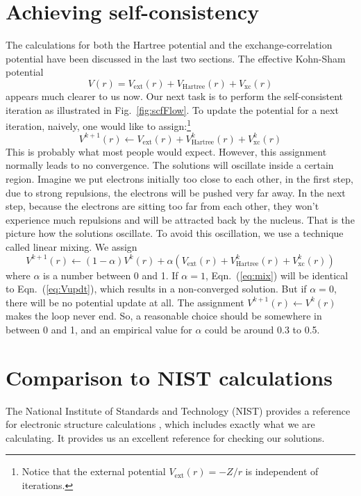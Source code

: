 \section{Achieving self-consistency}
The calculations for both the Hartree potential and the exchange-correlation
potential have been discussed in the last two sections. The effective Kohn-Sham potential
\begin{equation} \label{eq:Vks}
V(r) = V_{\text{ext}}(r) + V_{\text{Hartree}}(r) + V_{\text{xc}}(r)
\end{equation}
appears much clearer to us now. Our next task is to perform the self-consistent
iteration as illustrated in Fig.~\ref{fig:scfFlow}. To update the potential
for a next iteration, naively, one would like to assign:\footnote{Notice
that the external potential $V_{\text{ext}}(r)=-Z/r$ is independent of iterations.}
\begin{equation} \label{eq:Vupdt}
V^{k+1}(r) \gets V_{\text{ext}}(r) + V_{\text{Hartree}}^k(r) + V_{\text{xc}}^k(r)
\end{equation}
%
This is probably what most people would expect. However, this assignment normally
leads to no convergence. The solutions will oscillate inside a
certain region. Imagine we put electrons initially too close to each other,
in the first step, due to strong repulsions, the electrons will be pushed
very far away. In the next step, because the electrons are sitting too
far from each other, they won't experience much repulsions and will be attracted
back by the nucleus. That is the picture how the solutions oscillate.
To avoid this oscillation, we use a technique called linear mixing.
We assign
\begin{equation} \label{eq:mix}
V^{k+1}(r) \gets (1-\alpha) V^k(r) + \alpha \left( V_{\text{ext}}(r) + V_{\text{Hartree}}^k(r) + V_{\text{xc}}^k(r) \right)
\end{equation}
where $\alpha$ is a number between 0 and 1. If $\alpha=1$, Eqn.~(\ref{eq:mix}) will
be identical to Eqn.~(\ref{eq:Vupdt}), which results in a non-converged solution.
But if $\alpha=0$, there will be no potential update at all. The assignment
$V^{k+1}(r) \gets V^k(r)$ makes the loop never end. So, a reasonable choice should
be somewhere in between 0 and 1, and an empirical value for $\alpha$
could be around 0.3 to 0.5.

\section{Comparison to NIST calculations}
The National Institute of Standards and Technology (NIST) provides a
reference for electronic structure calculations \cite{NIST}, which includes
exactly what we are calculating. It provides us an excellent reference for
checking our solutions.

